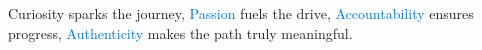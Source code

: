 \documentclass[preview]{standalone}
\begin{document}
\begin{center}
Curiosity sparks the journey, \textcolor{#0074C8}{Passion} fuels the drive, \textcolor{#0074C8}{Accountability} ensures progress, \textcolor{#0074C8}{Authenticity} makes the path truly meaningful.
\end{center}
\end{document}
